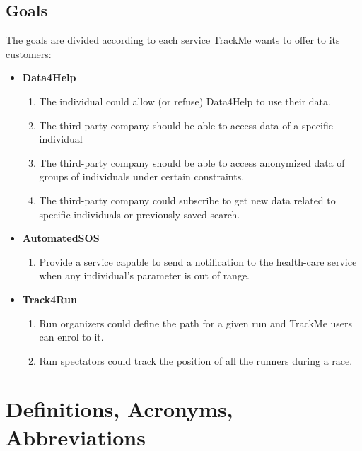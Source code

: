 \documentclass[hidelinks, 12pt]{report}
\newcommand\goal[1]{\item[{[G#1]}] }
\begin{document}
	\subsection{Goals}
	The goals are divided according to each service TrackMe wants to offer to its customers:
	\begin{itemize}
		\item{\textbf{Data4Help}}
		\begin{enumerate}
			\goal{1} The individual could allow (or refuse) Data4Help to use their data.
			\goal{2} The third-party company should be able to access data of a specific individual
			\goal{3} The third-party company should be able to access anonymized data of groups of individuals under certain constraints.
			\goal{4} The third-party company could subscribe to get new data related to specific individuals or previously saved search.
		\end{enumerate}
		
		\item{\textbf{AutomatedSOS}}
		\begin{enumerate}
			\goal{5} Provide a service capable to send a notification to the health-care service when any individual's parameter is out of range.
		\end{enumerate}
		
		\item{\textbf{Track4Run}}
		\begin{enumerate}
			\goal{6} Run organizers could define the path for a given run and TrackMe users can enrol to it.
			\goal{7} Run spectators could track the position of all the runners during a race.
		\end{enumerate}
	\end{itemize}
	
	\section{Definitions, Acronyms, Abbreviations}
\end{document}
